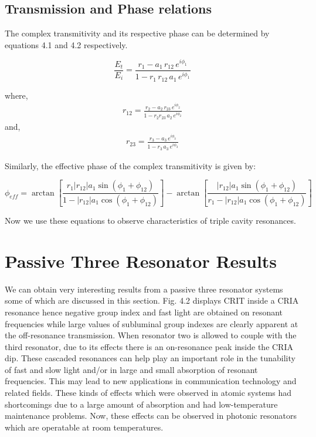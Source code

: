 \subsection{Transmission and Phase relations}
The complex transmitivity and its respective phase can be determined by equations 4.1 and 4.2 respectively. 

\begin{equation}
\frac{E_{t}}{E_{i}} = \frac{r_{1} - a_{1} \, r_{12} \, e^{i\phi_{1}}}{1 - r_{1}\, r_{12}\, a_{1}\, e^{i\phi_{1}}}
\end{equation}

where, 
\begin{align*}
r_{12} = \frac{r_{2} - a_{2}\, r_{23}\, e^{i \phi_{2}}} {1 - r_{2} r_{23}\, a_{2}\, e^{i \phi_{2}}} 
\end{align*}
and,
\begin{align*}
r_{23} = \frac{r_{3} - a_{3}\, e^{i \phi_{3}}} {1 - r_{3}\, a_{3}\, e^{i \phi_{3}}} 
\end{align*}

Similarly, the effective phase of the complex transmitivity is given by:

\begin{equation}
\phi_{eff} = \arctan[{\frac{r_{1} |r_{12}| a_{1} \sin{(\phi_{1} + \phi_{12})}}{1 - |r_{12}| a_{1} \cos{(\phi_{1} + \phi_{12})}}}] - \arctan[{\frac{|r_{12}| a_{1} \sin{(\phi_{1} + \phi_{12})}}{r_{1} - |r_{12}| a_{1} \cos{(\phi_{1} + \phi_{12})}}}]
\end{equation}

Now we use these equations to observe characteristics of triple cavity resonances.

\section{Passive Three Resonator Results}
We can obtain very interesting results from a passive three resonator systems some of which are discussed in this section. Fig. 4.2 displays CRIT inside a CRIA resonance hence negative group index and fast light are obtained on resonant frequencies while large values of subluminal group indexes are clearly apparent at the off-resonance transmission. When resonator two is allowed to couple with the third resonator, due to its effects there is an on-resonance peak inside the CRIA dip. These cascaded resonances can help play an important role in the tunability of fast and slow light and/or in large and small absorption of resonant frequencies. This may lead to new applications in communication technology and related fields. These kinds of effects which were observed in atomic systems had shortcomings due to a large amount of absorption and had low-temperature maintenance problems. Now, these effects can be observed in photonic resonators which are operatable at room temperatures.
